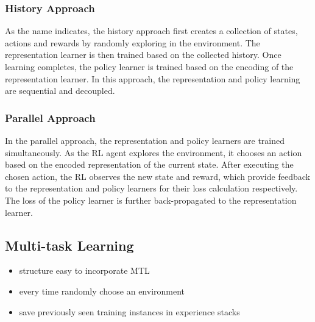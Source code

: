 \subsubsection{History Approach}
As the name indicates, the history approach first creates a collection of states, actions and rewards by randomly exploring in the environment.
The representation learner is then trained based on the collected history.
Once learning completes, the policy learner is trained based on the encoding of the representation learner.
In this approach, the representation and policy learning are sequential and decoupled. 

\subsubsection{Parallel Approach}
In the parallel approach, the representation and policy learners are trained simultaneously.
As the RL agent explores the environment, it chooses an action based on the encoded representation of the current state.
After executing the chosen action, the RL observes the new state and reward, which provide feedback to the representation and policy learners for their loss calculation respectively.
The loss of the policy learner is further back-propagated to the representation learner.


\subsection{Multi-task Learning}
\begin{itemize}
	\item structure easy to incorporate MTL
	\item every time randomly choose an environment
	\item save previously seen training instances in experience stacks
\end{itemize}